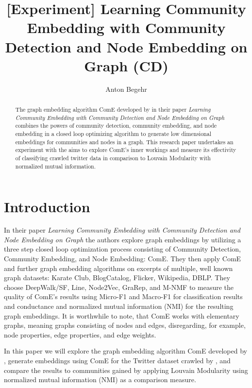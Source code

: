 \documentclass[sigconf]{acmart}
\begin{document}
\title{[Experiment] Learning Community Embedding with Community Detection and Node Embedding on Graph (CD)}

\author{Anton Begehr}


\begin{abstract}
  The graph embedding algorithm ComE developed by \citeauthor{Cav17} in their \citeyear{Cav17} paper \textit{Learning Community Embedding with Community Detection and Node Embedding on Graph} combines the powers of community detection, community embedding, and node embedding in a closed loop optimizing algorithm to generate low dimensional embeddings for communities and nodes in a graph. This research paper undertakes an experiment with the aims to explore ComE's inner workings and measure its effectivity of classifying crawled twitter data in comparison to Louvain Modularity with normalized mutual information.
\end{abstract}


\maketitle

\section{Introduction}

In their \citeyear{Cav17} paper \textit{Learning Community Embedding with Community Detection and Node Embedding on Graph} the authors \citeauthor{Cav17} explore graph embeddings by utilizing a three step closed loop optimization process consisting of Community Detection, Community Embedding, and Node Embedding: ComE.\cite{Cav17} They then apply ComE and further graph embedding algorithms on excerpts of multiple, well known graph datasets: Karate Club, BlogCatalog, Flicker, Wikipedia, DBLP. They choose DeepWalk/SF, Line, Node2Vec, GraRep, and M-NMF to measure the quality of ComE's results using Micro-F1 and Macro-F1 for classification results and conductance and normalized mutual information (NMI) for the resulting graph embeddings. It is worthwhile to note, that ComE works with elementary graphs, meaning graphs consisting of nodes and edges, disregarding, for example, node properties, edge properties, and edge weights.

In this paper we will explore the graph embedding algorithm ComE developed by \citeauthor{Cav17}, generate embeddings using ComE for the Twitter dataset \cite{TwitterData} crawled by \citeauthor{TwitterData}, and compare the results to communities gained by applying Louvain Modularity using normalized mutual information (NMI) as a comparison measure.
\end{document}
